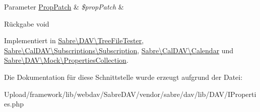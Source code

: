 \begin{DoxyParams}[1]{Parameter}
\mbox{\hyperlink{class_sabre_1_1_d_a_v_1_1_prop_patch}{Prop\+Patch}} & {\em \$prop\+Patch} & \\
\hline
\end{DoxyParams}
\begin{DoxyReturn}{Rückgabe}
void 
\end{DoxyReturn}


Implementiert in \mbox{\hyperlink{class_sabre_1_1_d_a_v_1_1_tree_file_tester_a474b2d04545674413ad86531abcc2105}{Sabre\textbackslash{}\+D\+A\+V\textbackslash{}\+Tree\+File\+Tester}}, \mbox{\hyperlink{class_sabre_1_1_cal_d_a_v_1_1_subscriptions_1_1_subscription_a54715146cf54f0368920d5fa315c609c}{Sabre\textbackslash{}\+Cal\+D\+A\+V\textbackslash{}\+Subscriptions\textbackslash{}\+Subscription}}, \mbox{\hyperlink{class_sabre_1_1_cal_d_a_v_1_1_calendar_ac0dbb7fd0a45e725bfbe0cebdadf92e7}{Sabre\textbackslash{}\+Cal\+D\+A\+V\textbackslash{}\+Calendar}} und \mbox{\hyperlink{class_sabre_1_1_d_a_v_1_1_mock_1_1_properties_collection_a2226758ceb984e4c151a89973564e1f6}{Sabre\textbackslash{}\+D\+A\+V\textbackslash{}\+Mock\textbackslash{}\+Properties\+Collection}}.



Die Dokumentation für diese Schnittstelle wurde erzeugt aufgrund der Datei\+:\begin{DoxyCompactItemize}
\item 
Upload/framework/lib/webdav/\+Sabre\+D\+A\+V/vendor/sabre/dav/lib/\+D\+A\+V/I\+Properties.\+php\end{DoxyCompactItemize}
